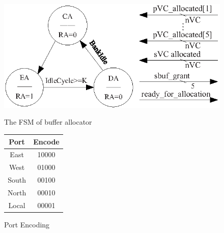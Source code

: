 \documentclass[paper]{ieice}
\begin{document}
\begin{figure}[htb]
  \begin{minipage}[b]{0.3\textwidth}
    \centering\includegraphics[scale=0.52]{figures/allocFSM.eps}
    \caption{The FSM of buffer allocator}\label{allocFSM}
  \end{minipage}%
  \begin{minipage}[b]{0.2\textwidth}
    \centering
    \begin{tabular}{|c|c|}
      \hline
      Port & Encode \\
      \hline\hline
      East  & 10000 \\
      \hline
      West    & 01000 \\
      \hline
      South &   00100\\
      \hline
      North & 00010\\
      \hline
      Local & 00001\\
      \hline
    \end{tabular}
    \caption{Port Encoding}\label{portencode}
  \end{minipage}
\end{figure}
\end{document}
